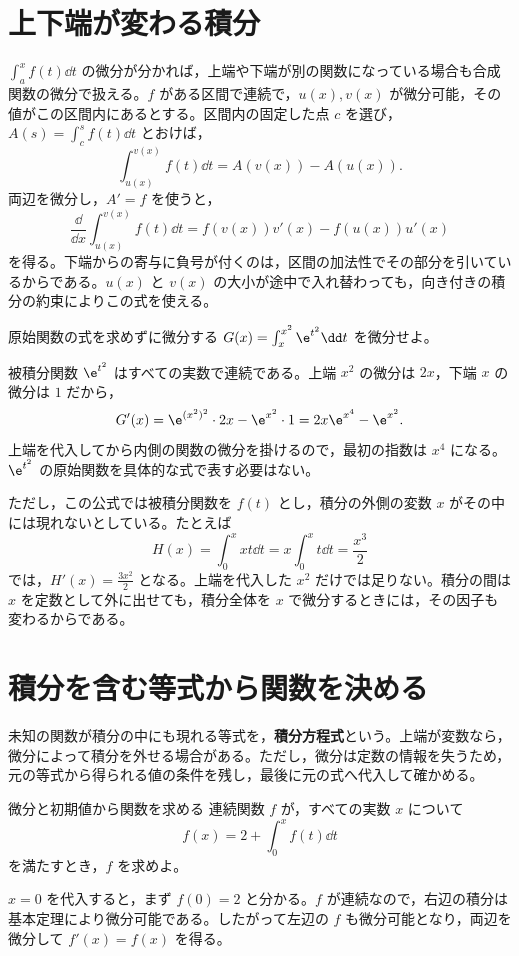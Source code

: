 \section{上下端が変わる積分}\label{節:変数上下端}
$\int_a^x f(t)\dd t$ の微分が分かれば，上端や下端が別の関数になっている場合も合成関数の微分で扱える。$f$ がある区間で連続で，$u(x),v(x)$ が微分可能，その値がこの区間内にあるとする。区間内の固定した点 $c$ を選び，$A(s)=\int_c^s f(t)\dd t$ とおけば，
\[
 \int_{u(x)}^{v(x)}f(t)\dd t=A(v(x))-A(u(x)).
\]
両辺を微分し，$A'=f$ を使うと，
\[
 \boxed{\frac{\dd}{\dd x}\int_{u(x)}^{v(x)}f(t)\dd t
 =f(v(x))v'(x)-f(u(x))u'(x)}
\]
を得る。下端からの寄与に負号が付くのは，区間の加法性でその部分を引いているからである。$u(x)$ と $v(x)$ の大小が途中で入れ替わっても，向き付きの積分の約束によりこの式を使える。

\begin{example}{原始関数の式を求めずに微分する}
$G(x)=\int_x^{x^2}\e^{t^2}\dd t$ を微分せよ。
\end{example}
被積分関数 $\e^{t^2}$ はすべての実数で連続である。上端 $x^2$ の微分は $2x$，下端 $x$ の微分は $1$ だから，
\[
 G'(x)=\e^{(x^2)^2}\cdot2x-\e^{x^2}\cdot1
       =2x\e^{x^4}-\e^{x^2}.
\]
上端を代入してから内側の関数の微分を掛けるので，最初の指数は $x^4$ になる。$\e^{t^2}$ の原始関数を具体的な式で表す必要はない。

ただし，この公式では被積分関数を $f(t)$ とし，積分の外側の変数 $x$ がその中には現れないとしている。たとえば
\[
 H(x)=\int_0^x xt\dd t
      =x\int_0^x t\dd t=\frac{x^3}{2}
\]
では，$H'(x)=\frac{3x^2}{2}$ となる。上端を代入した $x^2$ だけでは足りない。積分の間は $x$ を定数として外に出せても，積分全体を $x$ で微分するときには，その因子も変わるからである。

\section{積分を含む等式から関数を決める}\label{節:積分方程式}
未知の関数が積分の中にも現れる等式を，\textbf{積分方程式}という。上端が変数なら，微分によって積分を外せる場合がある。ただし，微分は定数の情報を失うため，元の等式から得られる値の条件を残し，最後に元の式へ代入して確かめる。

\begin{example}{微分と初期値から関数を求める}
連続関数 $f$ が，すべての実数 $x$ について
\[
 f(x)=2+\int_0^x f(t)\dd t
\]
を満たすとき，$f$ を求めよ。
\end{example}
$x=0$ を代入すると，まず $f(0)=2$ と分かる。$f$ が連続なので，右辺の積分は基本定理により微分可能である。したがって左辺の $f$ も微分可能となり，両辺を微分して $f'(x)=f(x)$ を得る。

